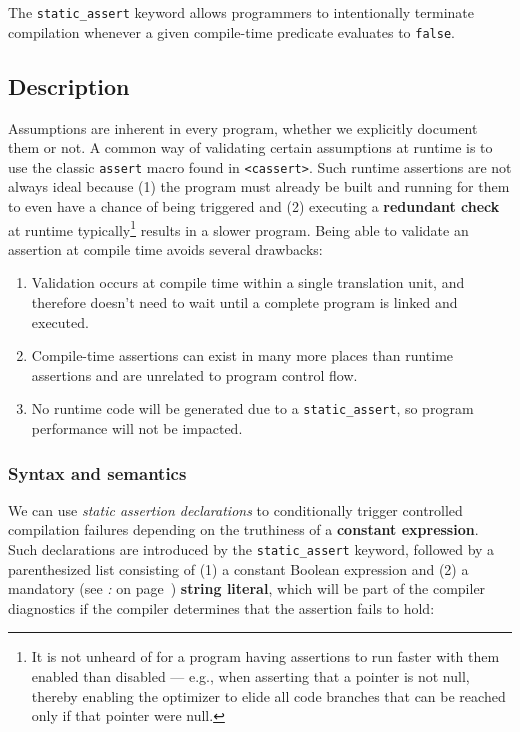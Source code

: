 

The \texttt{static\_assert} keyword allows programmers to intentionally terminate compilation whenever a given compile-time predicate
 evaluates to \texttt{false}.

\subsection[Description]{Description}\label{description}

Assumptions are
inherent in every program, whether we explicitly document them or not. A common way of validating certain
assumptions at runtime is to use the classic \texttt{assert} macro found
in \texttt{<cassert>}. Such runtime assertions are not always ideal
because (1) the program must already be built and running for them to
even have a chance of being triggered and (2) executing a
\textbf{redundant check} at runtime typically{\cprotect\footnote{It is
not unheard of for a program having assertions to run faster with them
enabled than disabled --- e.g., when asserting that a pointer is not
null, thereby enabling the optimizer to elide all code branches that
  can be reached only if that pointer were null.}} results in a slower
program. Being able to validate an assertion at compile time avoids
several drawbacks:

\begin{enumerate}
\item{Validation occurs at compile time within a single translation unit, and therefore doesn’t need to wait until a complete program is linked and executed.}
\item{Compile-time assertions can exist in many more places than runtime assertions and are unrelated to program control flow.}
\item{No runtime code will be generated due to a \texttt{static\_assert}, so program performance will not be impacted.}
\end{enumerate}

\subsubsection[Syntax and semantics]{Syntax and semantics}\label{syntax-and-semantics}

We can use \emph{static assertion declarations} to conditionally trigger
controlled compilation failures depending on the truthiness of a
\textbf{constant expression}. Such declarations are introduced by the
\texttt{static\_assert} keyword, followed by a parenthesized list
consisting of (1) a constant Boolean expression and (2) a mandatory (see
{\it{}: } on page~\pageref{mandatory-string-literal}) \textbf{string literal}, which will be
part of the compiler diagnostics if the compiler determines that the
assertion fails to hold:

